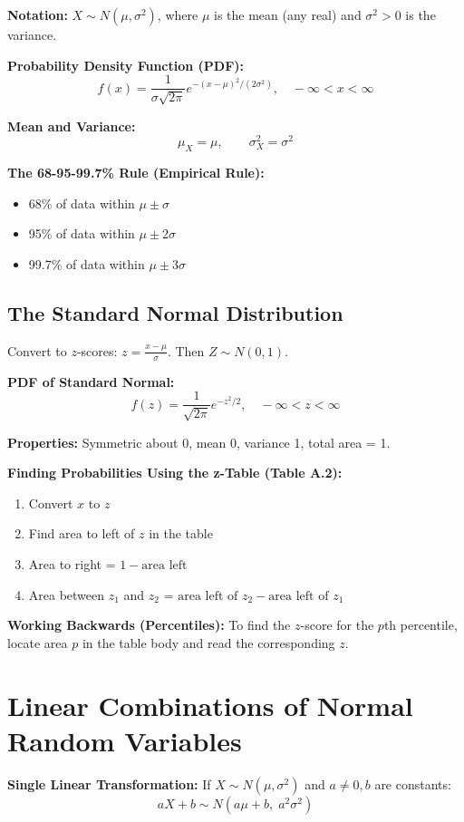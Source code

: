 \documentclass[11pt]{article}
\begin{document}
\textbf{Notation:} \(X \sim N(\mu,\sigma^2)\), where \(\mu\) is the mean (any real) and \(\sigma^2>0\) is the variance.

\textbf{Probability Density Function (PDF):}
\[
f(x) = \frac{1}{\sigma\sqrt{2\pi}} e^{-(x-\mu)^2/(2\sigma^2)},\quad -\infty < x < \infty
\]

\textbf{Mean and Variance:}
\[
\mu_X = \mu,\qquad \sigma_X^2 = \sigma^2
\]

\textbf{The 68-95-99.7\% Rule (Empirical Rule):}
\begin{itemize}[nosep]
    \item 68\% of data within \(\mu \pm \sigma\)
    \item 95\% of data within \(\mu \pm 2\sigma\)
    \item 99.7\% of data within \(\mu \pm 3\sigma\)
\end{itemize}

\subsection*{The Standard Normal Distribution}
Convert to \(z\)-scores: \(z = \frac{x-\mu}{\sigma}\). Then \(Z \sim N(0,1)\).

\textbf{PDF of Standard Normal:}
\[
f(z) = \frac{1}{\sqrt{2\pi}} e^{-z^2/2},\quad -\infty < z < \infty
\]

\textbf{Properties:} Symmetric about 0, mean 0, variance 1, total area = 1.

\textbf{Finding Probabilities Using the z-Table (Table A.2):}
\begin{enumerate}[nosep]
    \item Convert \(x\) to \(z\)
    \item Find area to left of \(z\) in the table
    \item Area to right = \(1 - \text{area left}\)
    \item Area between \(z_1\) and \(z_2\) = \(\text{area left of }z_2 - \text{area left of }z_1\)
\end{enumerate}

\textbf{Working Backwards (Percentiles):} To find the \(z\)-score for the \(p\)th percentile, locate area \(p\) in the table body and read the corresponding \(z\).

\section*{Linear Combinations of Normal Random Variables}
\textbf{Single Linear Transformation:}
If \(X \sim N(\mu,\sigma^2)\) and \(a \neq 0, b\) are constants:
\[
aX + b \sim N(a\mu + b,\; a^2\sigma^2)
\]
\end{document}
